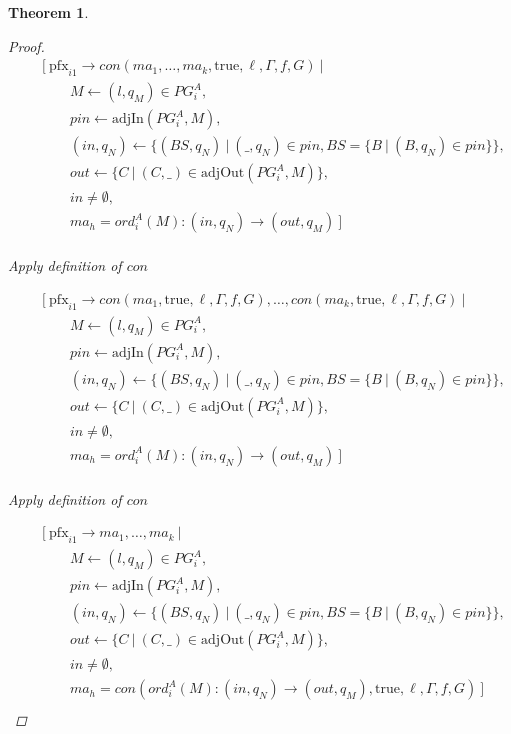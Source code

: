 \documentclass[twocolumn, openany]{sig-alternate-10pt}
\newcommand{\Pfx}{\mathrm{pfx}}%
\newtheorem{thm}{Theorem}
\begin{document}
\begin{thm}
\begin{proof}
  \[ \begin{array}{l}
     ~~~~~~~~~ [~ \Pfx_{i1} \rightarrow con(ma_1, \dots, ma_k,\text{true},\ell,\Gamma,f,G) ~\vert~ \\
     ~~~~~~~~~~~~~~~~~~ M \leftarrow (l,q_M) \in PG^A_i, \\
     ~~~~~~~~~~~~~~~~~~ pin \leftarrow \text{adjIn}(PG^A_i,M), \\
     ~~~~~~~~~~~~~~~~~~ (in,q_N) \leftarrow \{ (BS,q_N) ~\vert~ (\_,q_N) \in pin, BS=\{B ~\vert~ (B,q_N) \in pin \} \}, \\
     ~~~~~~~~~~~~~~~~~~ out \leftarrow \{ C ~\vert~ (C,\_) \in \text{adjOut}(PG^A_i,M) \}, \\
     ~~~~~~~~~~~~~~~~~~ in \neq \emptyset, \\
     ~~~~~~~~~~~~~~~~~~ ma_h = ord^A_i(M) : (in,q_N) \rightarrow (out,q_M) ~] \\
  \end{array} \]%

  Apply definition of $con$

  \[ \begin{array}{l}
     ~~~~~~~~~ [~ \Pfx_{i1} \rightarrow con(ma_1,\text{true},\ell,\Gamma,f,G), \dots, con(ma_k,\text{true},\ell,\Gamma,f,G) ~\vert~ \\
     ~~~~~~~~~~~~~~~~~~ M \leftarrow (l,q_M) \in PG^A_i, \\
     ~~~~~~~~~~~~~~~~~~ pin \leftarrow \text{adjIn}(PG^A_i,M), \\
     ~~~~~~~~~~~~~~~~~~ (in,q_N) \leftarrow \{ (BS,q_N) ~\vert~ (\_,q_N) \in pin, BS=\{B ~\vert~ (B,q_N) \in pin \} \}, \\
     ~~~~~~~~~~~~~~~~~~ out \leftarrow \{ C ~\vert~ (C,\_) \in \text{adjOut}(PG^A_i,M) \}, \\
     ~~~~~~~~~~~~~~~~~~ in \neq \emptyset, \\
     ~~~~~~~~~~~~~~~~~~ ma_h = ord^A_i(M) : (in,q_N) \rightarrow (out,q_M) ~] \\
  \end{array} \]%

  Apply definition of $con$

  \[ \begin{array}{l}
     ~~~~~~~~~ [~ \Pfx_{i1} \rightarrow ma_1, \dots, ma_k ~\vert~ \\
     ~~~~~~~~~~~~~~~~~~ M \leftarrow (l,q_M) \in PG^A_i, \\
     ~~~~~~~~~~~~~~~~~~ pin \leftarrow \text{adjIn}(PG^A_i,M), \\
     ~~~~~~~~~~~~~~~~~~ (in,q_N) \leftarrow \{ (BS,q_N) ~\vert~ (\_,q_N) \in pin, BS=\{B ~\vert~ (B,q_N) \in pin \} \}, \\
     ~~~~~~~~~~~~~~~~~~ out \leftarrow \{ C ~\vert~ (C,\_) \in \text{adjOut}(PG^A_i,M) \}, \\
     ~~~~~~~~~~~~~~~~~~ in \neq \emptyset, \\
     ~~~~~~~~~~~~~~~~~~ ma_h = con(ord^A_i(M) : (in,q_N) \rightarrow (out,q_M),\text{true},\ell,\Gamma,f,G) ~] \\
  \end{array} \]%


\end{proof}
\end{thm}
\end{document}
